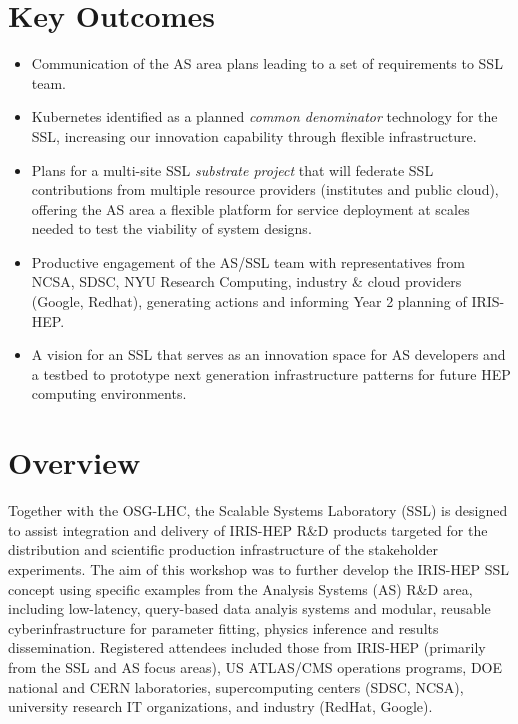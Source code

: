 \documentclass[11pt,letterpaper,fleqn]{article}
\begin{document}
\section*{Key Outcomes}
\vspace{3pt}
\begin{itemize}
  \item Communication of the AS area plans leading to a set of requirements to SSL team.
  \item Kubernetes identified as a planned {\it common denominator} technology for the SSL, increasing our innovation capability through flexible infrastructure.
  \item Plans for a multi-site SSL {\it substrate project} that will federate SSL contributions from multiple resource providers (institutes and public cloud), offering the AS area a flexible platform for service deployment at scales needed to test the viability of system designs.
  \item Productive engagement of the AS/SSL team with representatives from NCSA, SDSC, NYU Research Computing, industry \& cloud providers (Google, Redhat), generating actions and informing Year 2 planning of IRIS-HEP.
  \item A vision for an SSL that serves as an innovation space for AS developers and a testbed to prototype next generation infrastructure patterns for future HEP computing environments.
\end{itemize}


\newpage
\pagestyle{reststyle}

\section{Overview}
\vspace{0.2cm}
Together with the OSG-LHC, the Scalable Systems Laboratory (SSL) is designed to assist integration and delivery of IRIS-HEP R\&D products targeted for the distribution and scientific production infrastructure of the stakeholder experiments. The aim of this workshop was to further develop the IRIS-HEP SSL concept using specific examples from the Analysis Systems (AS) R\&D area, including low-latency, query-based data analyis systems and modular, reusable cyberinfrastructure for parameter fitting, physics inference and results dissemination. Registered attendees included those from IRIS-HEP (primarily from the SSL and AS focus areas), US ATLAS/CMS operations programs, DOE national and CERN laboratories, supercomputing centers (SDSC, NCSA), university research IT organizations, and industry (RedHat, Google).
\end{document}

